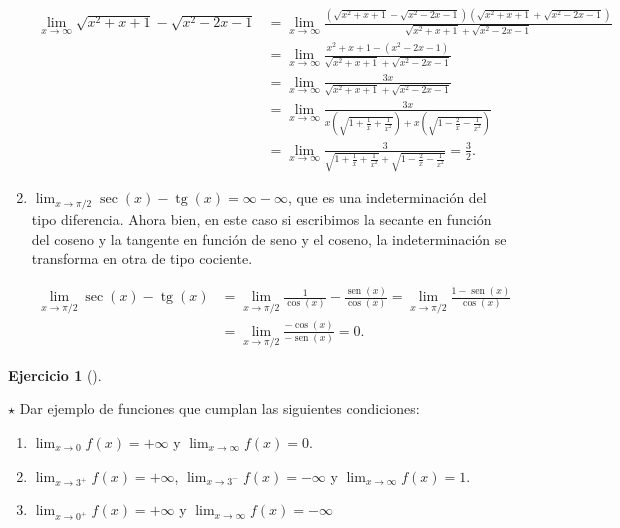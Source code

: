 \documentclass[
  a4paper,
]{scrreport}
\theoremstyle{definition}
\newtheorem{exercise}{Ejercicio}[chapter]
\theoremstyle{remark}
\begin{document}
\begin{tcolorbox}
\begin{enumerate}
  \begin{align*}
  \lim_{x\to \infty} \sqrt{x^2+x+1}-\sqrt{x^2-2x-1}
  &= \lim_{x \to \infty} \frac{(\sqrt{x^2+x+1} - \sqrt{x^2-2x-1})(\sqrt{x^2+x+1} + \sqrt{x^2-2x-1})}{\sqrt{x^2+x+1} + \sqrt{x^2-2x-1}} \\
  &= \lim_{x \to \infty} \frac{x^2+x+1 - (x^2-2x-1)}{\sqrt{x^2+x+1} + \sqrt{x^2-2x-1}} \\
  &= \lim_{x \to \infty} \frac{3x}{\sqrt{x^2+x+1} + \sqrt{x^2-2x-1}} \\
  &= \lim_{x \to \infty} \frac{3x}{x\left(\sqrt{1+\frac{1}{x}+\frac{1}{x^2}}\right) + x\left(\sqrt{1-\frac{2}{x}-\frac{1}{x^2}}\right)} \\
  &= \lim_{x \to \infty} \frac{3}{\sqrt{1+\frac{1}{x}+\frac{1}{x^2}} + \sqrt{1-\frac{2}{x}-\frac{1}{x^2}}} 
  = \frac{3}{2}.
  \end{align*}
\item
  \(\lim_{x\to \pi/2}\sec(x)-\operatorname{tg}(x) = \infty-\infty\), que
  es una indeterminación del tipo diferencia. Ahora bien, en este caso
  si escribimos la secante en función del coseno y la tangente en
  función de seno y el coseno, la indeterminación se transforma en otra
  de tipo cociente.

  \begin{align*}
   \lim_{x\to \pi/2}\sec(x)-\operatorname{tg}(x)
   &= \lim_{x\to \pi/2}\frac{1}{\cos(x)}-\frac{\operatorname{sen}(x)}{\cos(x)}
   = \lim_{x\to \pi/2}\frac{1-\operatorname{sen}(x)}{\cos(x)} \\
   &= \lim_{x\to \pi/2}\frac{-\cos(x)}{-\operatorname{sen}(x)}
   = 0.
   \end{align*}
\end{enumerate}

\end{tcolorbox}

\begin{exercise}[]\protect\hypertarget{exr-ejemplos-limites-laterales}{}\label{exr-ejemplos-limites-laterales}

\(\star\) Dar ejemplo de funciones que cumplan las siguientes
condiciones:

\begin{enumerate}
\def\labelenumi{\alph{enumi}.}
\item
  \(\lim_{x\to 0}f(x)=+\infty\) y \(\lim_{x\to \infty}f(x)=0\).
\item
  \(\lim_{x\to 3^+}f(x)=+\infty\), \(\lim_{x\to 3^-}f(x)=-\infty\) y
  \(\lim_{x\to \infty}f(x)=1\).
\item
  \(\lim_{x\to 0^+}f(x)=+\infty\) y \(\lim_{x\to \infty}f(x)=-\infty\)
\end{enumerate}

\end{exercise}
\end{document}
